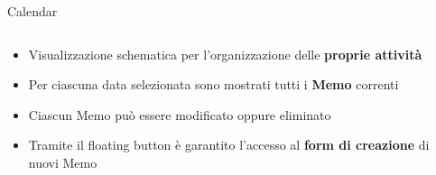 \documentclass[10pt]{beamer}
\begin{document}
\begin{frame}{Calendar}
    \begin{columns}
        \begin{column}{0.5\textwidth}
            \hspace*{100pt}
            \begin{itemize}
                \item \small Visualizzazione schematica per l'organizzazione delle \textbf{proprie attività}
                \item \small Per ciascuna data selezionata sono mostrati tutti i \textbf{Memo} correnti
                \item \small Ciascun Memo può essere modificato oppure eliminato
                \item \small Tramite il floating button è garantito l'accesso al \textbf{form di creazione} di nuovi Memo
            \end{itemize}
        \end{column}
        \begin{column}{0.5\textwidth}
            \begin{center}
            \end{center}
        \end{column}
    \end{columns}
\end{frame}
\end{document}
